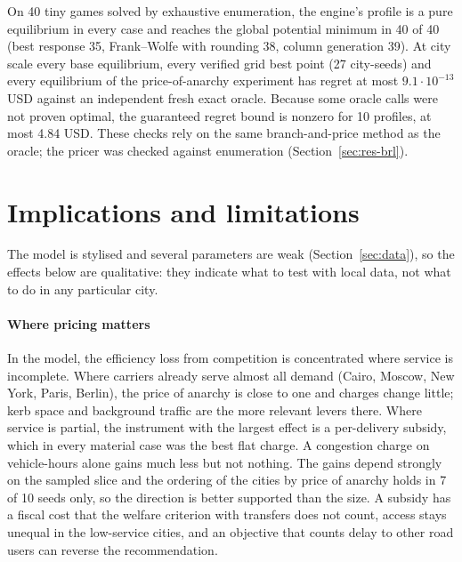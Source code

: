 \documentclass[preprint,11pt]{elsarticle}
\theoremstyle{definition}
\theoremstyle{remark}
\begin{document}
On 40 tiny games solved by exhaustive enumeration, the engine's profile is a pure equilibrium in every case and reaches the global potential minimum in 40 of 40 (best response 35, Frank--Wolfe with rounding 38, column generation 39). At city scale every base equilibrium, every verified grid best point (27 city-seeds) and every equilibrium of the price-of-anarchy experiment has regret at most $9.1\cdot10^{-13}$ USD against an independent fresh exact oracle. Because some oracle calls were not proven optimal, the guaranteed regret bound is nonzero for 10 profiles, at most 4.84 USD. These checks rely on the same branch-and-price method as the oracle; the pricer was checked against enumeration (Section~\ref{sec:res-brl}).

\section{Implications and limitations}\label{sec:discussion}\label{sec:implications}\label{sec:limits}

The model is stylised and several parameters are weak (Section~\ref{sec:data}), so the effects below are qualitative: they indicate what to test with local data, not what to do in any particular city.

\paragraph{Where pricing matters} In the model, the efficiency loss from competition is concentrated where service is incomplete. Where carriers already serve almost all demand (Cairo, Moscow, New York, Paris, Berlin), the price of anarchy is close to one and charges change little; kerb space and background traffic are the more relevant levers there. Where service is partial, the instrument with the largest effect is a per-delivery subsidy, which in every material case was the best flat charge. A congestion charge on vehicle-hours alone gains much less but not nothing. The gains depend strongly on the sampled slice and the ordering of the cities by price of anarchy holds in 7 of 10 seeds only, so the direction is better supported than the size. A subsidy has a fiscal cost that the welfare criterion with transfers does not count, access stays unequal in the low-service cities, and an objective that counts delay to other road users can reverse the recommendation.
\end{document}

